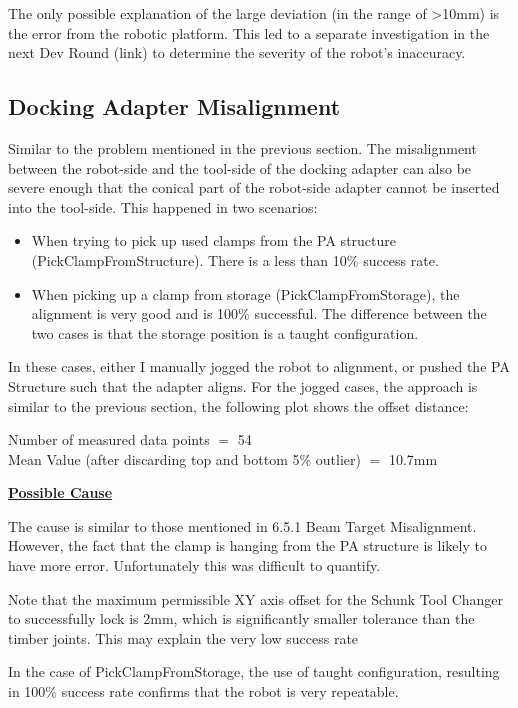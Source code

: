 {The only possible explanation of the large deviation (in the range of >10mm) is the error from the robotic platform. This led to a separate investigation in the next Dev Round (link) to determine the severity of the robot’s inaccuracy.

\subsection{Docking Adapter Misalignment}

Similar to the problem mentioned in the previous section. The misalignment between the robot-side and the tool-side of the docking adapter can also be severe enough that the conical part of the robot-side adapter cannot be inserted into the tool-side. This happened in two scenarios:

\begin{itemize}
	\item When trying to pick up used clamps from the PA structure (PickClampFromStructure). There is a less than 10$\%$ success rate.

	\item When picking up a clamp from storage (PickClampFromStorage), the alignment is very good and is 100$\%$ successful. The difference between the two cases is that the storage position is a taught configuration.

\end{itemize}
In these cases, either I manually jogged the robot to alignment, or pushed the PA Structure such that the adapter aligns. For the jogged cases, the approach is similar to the previous section, the following plot shows the offset distance:


{\footnotesize Number of measured data points $=$ 54 \\ Mean Value (after discarding top and bottom 5$\%$ outlier) $=$ 10.7mm}

\textbf{\ul{Possible Cause}}

The cause is similar to those mentioned in 6.5.1 Beam Target Misalignment. However, the fact that the clamp is hanging from the PA structure is likely to have more error. Unfortunately this was difficult to quantify. 

Note that the maximum permissible XY axis offset for the Schunk Tool Changer to successfully lock is 2mm, which is significantly smaller tolerance than the timber joints. This may explain the very low success rate

In the case of PickClampFromStorage, the use of taught configuration, resulting in 100$\%$ success rate confirms that the robot is very repeatable. 

}
